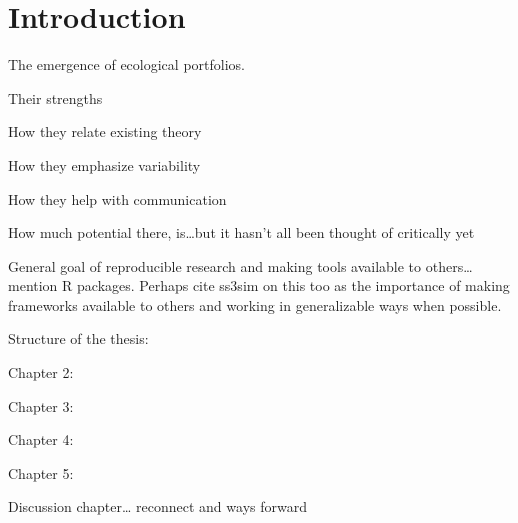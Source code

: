 \chapter{Introduction}

The emergence of ecological portfolios.

Their strengths

How they relate existing theory

How they emphasize variability

How they help with communication

How much potential there, is\ldots but it hasn't all been thought of critically yet

General goal of reproducible research and making tools available to others\ldots mention R packages. Perhaps cite ss3sim on this too as the importance of making frameworks available to others and working in generalizable ways when possible.

Structure of the thesis:

Chapter 2:

Chapter 3:

Chapter 4:

Chapter 5:

Discussion chapter\ldots
reconnect and ways forward
